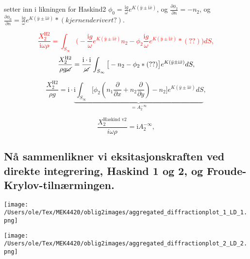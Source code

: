 setter inn i likningen for Haskind2
$\phi_0 = \frac{\mathrm{i} g}{\omega} e^{K (\bar{y} \pm \mathrm{i}  \bar{x})}$, og $\frac{\partial \phi_2}{\partial n} = -n_2$, og $\frac{\partial \phi_0}{\partial n} = \frac{\mathrm{i} g}{\omega} e^{K (\bar{y} \pm \mathrm{i}  \bar{x})} * (kjernen derivert?)$.

\textcolor{red}{
\begin{equation}
\frac{X_2^{\text{H2}}}{\mathrm{i} \omega \rho} = \int_{S_\infty}  \big( -\frac{\mathrm{i} g}{\omega} e^{K (\bar{y} \pm \mathrm{i}  \bar{x})} n_2 -\phi_2\frac{\mathrm{i} g}{\omega} e^{K (\bar{y} \pm \mathrm{i}  \bar{x})} * (??)  \big) dS, 
\end{equation}
\begin{equation}
\frac{X_2^{\text{H2}}}{\rho g\cancel{\omega}  } = \frac{\mathrm{i} \cdot \mathrm{i} }{\cancel{\omega}}  \int_{S_\infty}  \big[ -n_2 -\phi_2 * (??)  \big]  e^{K (\bar{y} \pm \mathrm{i}  \bar{x})} dS, 
\end{equation}}

\begin{equation}
\frac{X_2^{\text{H2}}}{  \rho g} = \mathrm{i} \cdot \underbrace{\mathrm{i} \int_{S_\infty}  \big[ \phi_2(n_1\frac{\partial}{\partial x} + n_2\frac{\partial}{\partial y})   -n_2 \big]  e^{K (\bar{y} \pm \mathrm{i}  \bar{x})} dS}_{= A_2^{-\infty}}, 
\end{equation}

\begin{equation}
\frac{X_2^{\text{Haskind v2}}}{i \omega \rho} = \mathrm{i}  A_2^{- \infty}, 
\end{equation}


\subsection{Nå sammenlikner vi eksitasjonskraften ved direkte integrering, Haskind 1 og 2, og Froude-Krylov-tilnærmingen.}

\noindent
\begin{minipage}[t]{0.45\linewidth}
    \texttt{[image: /Users/ole/Tex/MEK4420/oblig2images/aggregated\_diffractionplot\_1\_LD\_1.png]}
    \label{fig:a22_1}
\end{minipage}
\hspace{0.05\linewidth}
\begin{minipage}[t]{0.45\linewidth}
    \texttt{[image: /Users/ole/Tex/MEK4420/oblig2images/aggregated\_diffractionplot\_2\_LD\_2.png]}
    \label{fig:a22_2}
\end{minipage}

